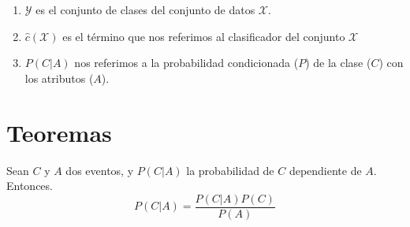 


\begin{enumerate}


    \item $\mathcal{Y}$ es el conjunto de clases del conjunto de datos $\mathcal{X}$.
    \item $\hat{c}(\mathcal{X})$ es el término que nos referimos al clasificador del conjunto $\mathcal{X}$
    \item $P(C|A)$ nos referimos a la probabilidad condicionada ($P$) de la clase ($C$) con los atributos ($A$).
\end{enumerate}


\chapter*{Teoremas}


\begin{theorem}[Bayes]
    \label{theorem:bayes}
    Sean $C$ y $A$ dos eventos, y $P(C|A)$ la probabilidad de $C$ dependiente de $A$. Entonces.
    \[ P(C|A) = \frac{P(C|A) P(C)}{P(A)} \]
\end{theorem}